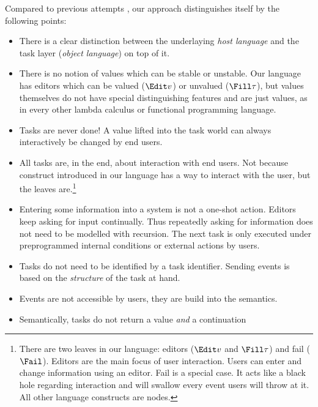 Compared to previous attempts \cite{conf/ifl/KoopmanPA08,conf/ppdp/PlasmeijerLMAK12,theses/radboud/VinterHviid18},
our approach distinguishes itself by the following points:
\begin{itemize}
  \item
    There is a clear distinction between the underlaying \emph{host language}
    and the task layer (\emph{object language}) on top of it.
  \item
    There is no notion of values which can be stable or unstable.
    Our language has editors which can be valued ($\Edit v$) or unvalued ($\Fill \tau$),
    but values themselves do not have special distinguishing features and are just values,
    as in every other lambda calculus or functional programming language.
  \item
    Tasks are never done!
    A value lifted into the task world can always interactively be changed by end users.
  \item
    All tasks are, in the end, about interaction with end users.
    Not because construct introduced in our language has a way to interact with the user,
    but the leaves are.\footnote{
      There are two leaves in our language: editors ($\Edit v$ and $\Fill \tau$) and fail ($\Fail$).
      Editors are the main focus of user interaction.
      Users can enter and change information using an editor.
      Fail is a special case.
      It acts like a black hole regarding interaction and will swallow every event users will throw at it.
      All other language constructs are nodes.
    }
  \item
    Entering some information into a system is not a one-shot action.
    Editors keep asking for input continually.
    Thus repeatedly asking for information does not need to be modelled with recursion.
    The next task is only executed under preprogrammed internal conditions or external actions by users.
  \item
    Tasks do not need to be identified by a task identifier.
    Sending events is based on the \emph{structure} of the task at hand.
  \item
    Events are not accessible by users, they are build into the semantics.
  \item
    Semantically, tasks do not return a value \emph{and} a continuation

\end{itemize}
